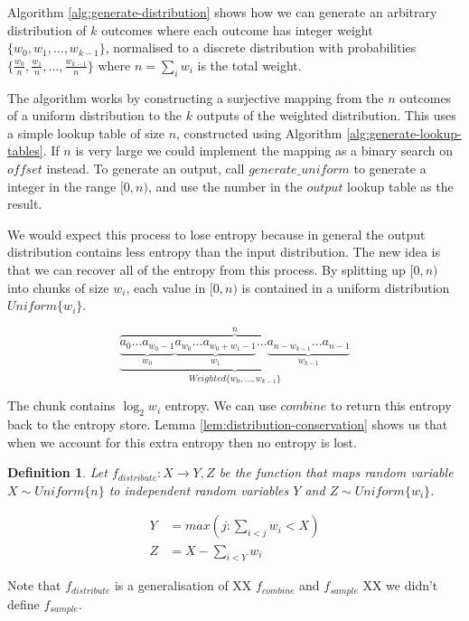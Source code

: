 \documentclass[12pt]{article}
\newtheorem{definition}{Definition}
\begin{document}
Algorithm \ref{alg:generate-distribution} shows how we can generate an arbitrary  distribution of $k$ outcomes where each outcome has integer weight $\{w_0, w_1, ..., w_{k-1}\}$, normalised to a discrete distribution with probabilities $\{\frac{w_0}{n}, \frac{w_1}{n}, ..., \frac{w_{k-1}}{n}\}$ where $n=\sum_i w_i$ is the total weight.

The algorithm works by constructing a surjective mapping from the $n$ outcomes of a uniform distribution to the $k$ outputs of the weighted distribution. This uses a simple lookup table of size $n$, constructed using Algorithm \ref{alg:generate-lookup-tables}. If $n$ is very large we could implement the mapping as a binary search on $offset$ instead. To generate an output, call $generate\_uniform$ to generate a integer in the range $[0,n)$, and use the number in the $output$ lookup table as the result. 

We would expect this process to lose entropy because in general the output distribution contains less entropy than the input distribution. The new idea is that we can recover all of the entropy from this process. By splitting up $[0,n)$ into chunks of size $w_i$, each value in $[0,n)$ is contained in a uniform distribution $Uniform\{w_i\}$.

\[
\overbrace{
    \underbrace{
        \underbrace{a_0 ... a_{w_0-1}}_{w_0}
          \underbrace{a_{w_0} ... a_{w_0+w_1-1}}_{w_1}
          ...
          \underbrace{
             a_{n-w_{k-1}} ... 
             a_{n-1}
         }_{w_{k-1}}
    }_{Weighted\{w_0, ..., w_{k-1}\}}
}^{n}
\]

The chunk contains $\log_2w_i$ entropy. We can use $combine$ to return this entropy back to the entropy store. Lemma \ref{lem:distribution-conservation} shows us that when we account for this extra entropy then no entropy is lost.



\begin{definition}
    Let $f_{distribute}: X \rightarrow Y, Z$ be the function that maps random variable $X \sim Uniform\{n\}$ to independent random variables $Y$ and $Z \sim Uniform\{w_i\}$.

    \begin{align}
    Y &= max(j : \sum_{i<j}w_i<X) \\
    Z &= X - \sum_{i<Y}w_i
    \end{align}

\end{definition}

Note that $f_{distribute}$ is a generalisation of XX $f_{combine}$ and $f_{sample}$ XX we didn't define $f_{sample}$.
\end{document}
